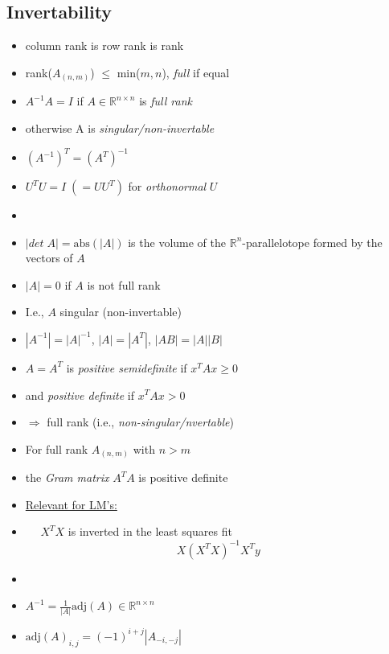 \documentclass[11pt, oneside]{article}
\begin{document}
\subsection{Invertability}
\begin{minipage}{0.5\linewidth} 
\begin{itemize}
\item column rank is row rank is rank
\item rank($A_{(n,m)}$) $\leq$ min($m,n$), \emph{full} if equal
\item $A^{-1}A = I$ if $A \in \mathbb{R}^{n\times n}$ is \emph{full rank} 
\item[] otherwise A is \emph{singular/non-invertable}
\item $(A^{-1})^T = (A^T)^{-1}$
\item $U^TU = I \;(= UU^T)$ for \emph{orthonormal} $U$ %
\item[]
\item $|det \;A| = \textrm{abs}(|A|)$ is the volume of the $\mathbb{R}^n$-parallelotope   
 formed by the vectors of $A$ 
\item $|A| = 0$ if $A$ is not full rank
\item[] I.e., $A$ singular (non-invertable)
\item $|A^{-1}|=|A|^{-1}$, $|A| = |A^T|$, $|AB| = |A||B|$
\end{itemize}  
\end{minipage}
\begin{minipage}{0.5\linewidth} 
\begin{itemize}  

\item  $A=A^T$ is \emph{positive semidefinite} if $x^TAx \geq 0$
\item[]  and \emph{positive definite} if $x^TAx > 0$     
\item[] $\Longrightarrow$ full rank (i.e., \emph{non-singular/nvertable}) 
\item For full rank $A_{(n,m)}$ with $n>m$
\item[] the \emph{Gram matrix} $A^TA$ is positive definite
\item[] \underline{Relevant for LM's:}
\item[] $\quad$ $X^TX$ is inverted in the least squares fit $$X(X^TX)^{-1}X^Ty$$
\item[]
\item $A^{-1} = \frac{1}{|A|}\textrm{adj}(A) \in \mathbb{R}^{n\times n}$
\item[] $\textrm{adj}(A)_{i,j}=(-1)^{i+j}|A_{-i,-j}|$ 
\end{itemize}  
\end{minipage}
\end{document}
